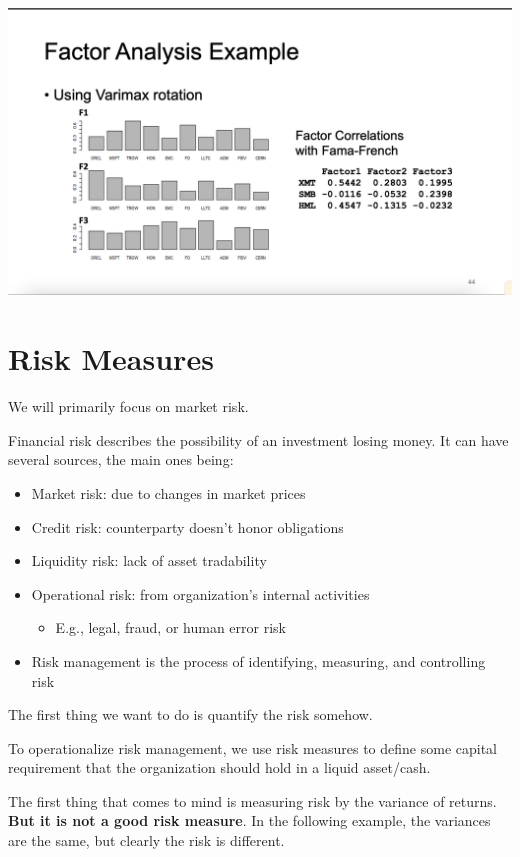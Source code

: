 \documentclass[
  oneside]{book}
\providecommand{\tightlist}{%
  \setlength{\itemsep}{0pt}\setlength{\parskip}{0pt}}
\begin{document}
\includegraphics{Notes/Obsidian-Attachments/6-Factor-Models-5.png}

\hypertarget{risk-measures}{%
\chapter{Risk Measures}\label{risk-measures}}

We will primarily focus on market risk.

Financial risk describes the possibility of an investment losing money. It can have several sources, the main ones being:

\begin{itemize}
\tightlist
\item
  Market risk: due to changes in market prices
\item
  Credit risk: counterparty doesn't honor obligations
\item
  Liquidity risk: lack of asset tradability
\item
  Operational risk: from organization's internal activities

  \begin{itemize}
  \tightlist
  \item
    E.g., legal, fraud, or human error risk
  \end{itemize}
\item
  Risk management is the process of identifying, measuring, and controlling risk
\end{itemize}

The first thing we want to do is quantify the risk somehow.

To operationalize risk management, we use risk measures to define some capital requirement that the organization should hold in a liquid asset/cash.

The first thing that comes to mind is measuring risk by the variance of returns. \textbf{But it is not a good risk measure}. In the following example, the variances are the same, but clearly the risk is different.
\end{document}
